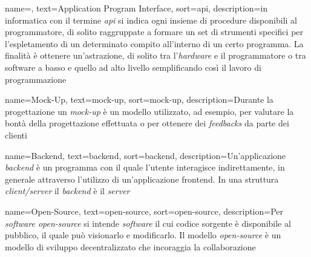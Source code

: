 
{
    name=,
    text=Application Program Interface,
    sort=api,
    description={in informatica con il termine \emph{\acrfull{api}} si indica ogni insieme di procedure disponibili al programmatore, di solito raggruppate a formare un set di strumenti specifici per l'espletamento di un determinato compito all'interno di un certo programma. La finalità è ottenere un'astrazione, di solito tra l'\emph{hardware} e il programmatore o tra software a basso e quello ad alto livello semplificando così il lavoro di programmazione}
}


{
    name=Mock-Up,
    text=mock-up,
    sort=mock-up,
    description={Durante la progettazione un \emph{mock-up} è un modello utilizzato, ad esempio, per valutare la bontà della progettazione effettuata o per ottenere dei \emph{feedbacks} da parte dei clienti}
}

{
    name=Backend,
    text=backend,
    sort=backend,
    description={Un'applicazione \emph{backend} è un programma con il quale l'utente interagisce indirettamente, in generale attraverso l'utilizzo di un'applicazione \gls{frontend}. In una struttura \emph{client/server} il \emph{backend} è il \emph{server}}
}

{
    name=Open-Source,
    text=open-source,
    sort=open-source,
    description={Per \emph{software open-source} si intende \emph{software} il cui codice sorgente è disponibile al pubblico, il quale può visionarlo e modificarlo. Il modello \emph{open-source} è un modello di sviluppo decentralizzato che incoraggia la collaborazione}
}

